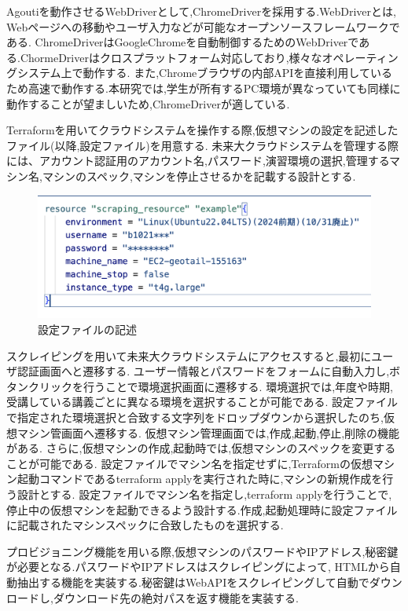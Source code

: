 \documentclass[11pt]{ujarticle}\sloppy
\begin{document}
Agoutiを動作させるWebDriverとして,ChromeDriverを採用する.WebDriverとは, Webページへの移動やユーザ入力などが可能なオープンソースフレームワークである.
ChromeDriverはGoogleChromeを自動制御するためのWebDriverである.ChormeDriverはクロスプラットフォーム対応しており,様々なオペレーティングシステム上で動作する.
また,Chromeブラウザの内部APIを直接利用しているため高速で動作する.本研究では,学生が所有するPC環境が異なっていても同様に動作することが望ましいため,ChromeDriverが適している.

Terraformを用いてクラウドシステムを操作する際,仮想マシンの設定を記述したファイル(以降,設定ファイル)を用意する.
未来大クラウドシステムを管理する際には、アカウント認証用のアカウント名,パスワード,演習環境の選択,管理するマシン名,マシンのスペック,マシンを停止させるかを記載する設計とする.


\begin{figure}[h]
	\includegraphics[width=1\linewidth]{./images/machine.png}
	\caption{設定ファイルの記述}
  \label{fig:machien}
\end{figure}


スクレイピングを用いて未来大クラウドシステムにアクセスすると,最初にユーザ認証画面へと遷移する.
ユーザー情報とパスワードをフォームに自動入力し,ボタンクリックを行うことで環境選択画面に遷移する.
環境選択では,年度や時期,受講している講義ごとに異なる環境を選択することが可能である.
設定ファイルで指定された環境選択と合致する文字列をドロップダウンから選択したのち,仮想マシン管画面へ遷移する.
仮想マシン管理画面では,作成,起動,停止,削除の機能がある.
さらに,仮想マシンの作成,起動時では,仮想マシンのスペックを変更することが可能である.
設定ファイルでマシン名を指定せずに,Terraformの仮想マシン起動コマンドであるterraform applyを実行された時に,マシンの新規作成を行う設計とする.
設定ファイルでマシン名を指定し,terraform applyを行うことで,停止中の仮想マシンを起動できるよう設計する.作成,起動処理時に設定ファイルに記載されたマシンスペックに合致したものを選択する.

プロビジョニング機能を用いる際,仮想マシンのパスワードやIPアドレス,秘密鍵が必要となる.パスワードやIPアドレスはスクレイピングによって,
HTMLから自動抽出する機能を実装する.秘密鍵はWebAPIをスクレイピングして自動でダウンロードし,ダウンロード先の絶対パスを返す機能を実装する.
\end{document}
